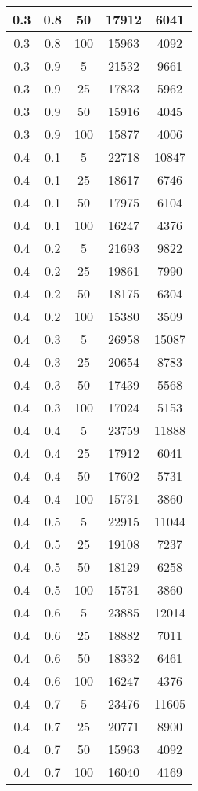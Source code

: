 \begin{appendices}
\begin{longtable}[c]{|c|c|c|c|c|}
	\hline
	0.3& 0.8& 50& 17912&  6041\\
	\hline
	0.3& 0.8& 100& 15963&  4092\\
	\hline
	0.3& 0.9& 5& 21532&  9661\\
	\hline
	0.3& 0.9& 25& 17833&  5962\\
	\hline
	0.3& 0.9& 50& 15916&  4045\\
	\hline
	0.3& 0.9& 100& 15877&  4006\\
	\hline
	0.4& 0.1& 5& 22718&  10847\\
	\hline
	0.4& 0.1& 25& 18617&  6746\\
	\hline
	0.4& 0.1& 50& 17975&  6104\\
	\hline
	0.4& 0.1& 100& 16247&  4376\\
	\hline
	0.4& 0.2& 5& 21693&  9822\\
	\hline
	0.4& 0.2& 25& 19861&  7990\\
	\hline
	0.4& 0.2& 50& 18175&  6304\\
	\hline
	0.4& 0.2& 100& 15380&  3509\\
	\hline
	0.4& 0.3& 5& 26958&  15087\\
	\hline
	0.4& 0.3& 25& 20654&  8783\\
	\hline
	0.4& 0.3& 50& 17439&  5568\\
	\hline
	0.4& 0.3& 100& 17024&  5153\\
	\hline
	0.4& 0.4& 5& 23759&  11888\\
	\hline
	0.4& 0.4& 25& 17912&  6041\\
	\hline
	0.4& 0.4& 50& 17602&  5731\\
	\hline
	0.4& 0.4& 100& 15731&  3860\\
	\hline
	0.4& 0.5& 5& 22915&  11044\\
	\hline
	0.4& 0.5& 25& 19108&  7237\\
	\hline
	0.4& 0.5& 50& 18129&  6258\\
	\hline
	0.4& 0.5& 100& 15731&  3860\\
	\hline
	0.4& 0.6& 5& 23885&  12014\\
	\hline
	0.4& 0.6& 25& 18882&  7011\\
	\hline
	0.4& 0.6& 50& 18332&  6461\\
	\hline
	0.4& 0.6& 100& 16247&  4376\\
	\hline
	0.4& 0.7& 5& 23476&  11605\\
	\hline
	0.4& 0.7& 25& 20771&  8900\\
	\hline
	0.4& 0.7& 50& 15963&  4092\\
	\hline
	0.4& 0.7& 100& 16040&  4169\\

\end{longtable}
\end{appendices}
